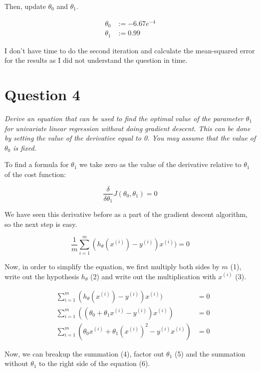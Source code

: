 \documentclass[12pt, a4paper]{article}
\begin{document}
		Then, update $\theta_0$ and $\theta_1$.
		
		\begin{align*}
		\theta_0 &:= -6.67e^{-4}\\
		\theta_1&:=0.99
		\end{align*}

I don't have time to do the second iteration and calculate the mean-squared error for the results as I did not understand the question in time.
	

\pagebreak


\section{Question 4}
\textit{Derive an equation that can be used to find the optimal value of the parameter $\theta_1$ for
univariate linear regression without doing gradient descent. This can be done by setting the value of the
derivative equal to 0. You may assume that the value of $\theta_0$ is fixed.}

	To find a formula for $\theta_1$ we take zero as the value of the derivative relative to $\theta_1$ of the cost function: 
	
	\begin{equation*}
	\frac{\delta}{\delta\theta_1}J(\theta_0, \theta_1) = 0
	\end{equation*}
	
	We have seen this derivative before as a part of the gradient descent algorithm, so the next step is easy. 
	
	\begin{equation*}
	 \frac{1}{m} \sum\limits_{i=1}^m (h _{\theta} (x ^{(i)}) - y ^{(i)})x^{(i)}) = 0
	\end{equation*}
	
	Now, in order to simplify the equation, we first multiply both sides by $m$ (1), write out the hypothesis $h_\theta$ (2) and write out the multiplication with $x^{(i)}$ (3).
	
	\begin{align}
	&\sum\limits_{i=1}^m(h_\theta(x^{(i)})-y^{(i)})x^{(i)}) &= 0\\
	&\sum\limits_{i=1}^m((\theta_0+\theta_1x^{(i)} - y^{(i)})x^{(i)}) &= 0\\
	&\sum\limits_{i=1}^m(\theta_0x^{(i)} + \theta_1(x^{(i)})^2 - y^{(i)}x^{(i)}) &= 0
	\end{align}
	
	Now, we can breakup the summation (4), factor out $\theta_1$ (5) and the summation without $\theta_1$ to the right side of the equation (6).
	
\end{document}
